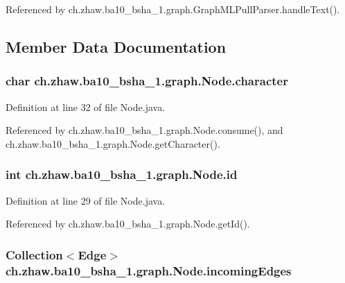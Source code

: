 Referenced by ch.zhaw.ba10\_\-bsha\_\-1.graph.GraphMLPullParser.handleText().

\subsection{Member Data Documentation}
\hypertarget{classch_1_1zhaw_1_1ba10__bsha__1_1_1graph_1_1Node_ab6bd424b381dc0f19d9f49d0b2cb56fc}{
\subsubsection[{character}]{\setlength{\rightskip}{0pt plus 5cm}char {\bf ch.zhaw.ba10\_\-bsha\_\-1.graph.Node.character}}}
\label{classch_1_1zhaw_1_1ba10__bsha__1_1_1graph_1_1Node_ab6bd424b381dc0f19d9f49d0b2cb56fc}


Definition at line 32 of file Node.java.

Referenced by ch.zhaw.ba10\_\-bsha\_\-1.graph.Node.consume(), and ch.zhaw.ba10\_\-bsha\_\-1.graph.Node.getCharacter().\hypertarget{classch_1_1zhaw_1_1ba10__bsha__1_1_1graph_1_1Node_a6ac4c87055132ff5de2f303d64baf0ba}{
\subsubsection[{id}]{\setlength{\rightskip}{0pt plus 5cm}int {\bf ch.zhaw.ba10\_\-bsha\_\-1.graph.Node.id}}}
\label{classch_1_1zhaw_1_1ba10__bsha__1_1_1graph_1_1Node_a6ac4c87055132ff5de2f303d64baf0ba}


Definition at line 29 of file Node.java.

Referenced by ch.zhaw.ba10\_\-bsha\_\-1.graph.Node.getId().\hypertarget{classch_1_1zhaw_1_1ba10__bsha__1_1_1graph_1_1Node_a588bea1c6cceb5f66e5e25115b9b12be}{
\subsubsection[{incomingEdges}]{\setlength{\rightskip}{0pt plus 5cm}Collection$<${\bf Edge}$>$ {\bf ch.zhaw.ba10\_\-bsha\_\-1.graph.Node.incomingEdges}}}
\label{classch_1_1zhaw_1_1ba10__bsha__1_1_1graph_1_1Node_a588bea1c6cceb5f66e5e25115b9b12be}


